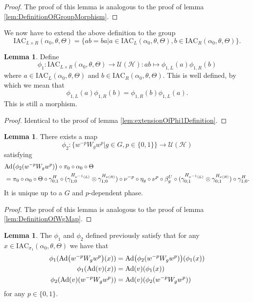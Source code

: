 \documentclass[12pt,a4paper,twoside]{article}
\newcommand{\IAC}{\textrm{IAC}}
\let\originalleft\left
\let\originalright\right
\renewcommand{\left}{\mathopen{}\mathclose\bgroup\originalleft}
\renewcommand{\right}{\aftergroup\egroup\originalright}
\newcommand{\UU}{\mathcal U}
\newcommand{\HH}{\mathcal H}
\newcommand{\Ad}[1]{\textrm{Ad}\left(#1\right)}
\theoremstyle{definition}
\newtheorem{lemma}[theorem]{Lemma}
\numberwithin{equation}{section}
\begin{document}
\begin{proof}
	The proof of this lemma is analogous to the proof of lemma \ref{lem:DefinitionOfGroupMorphism}.
\end{proof}
We now have to extend the above definition to the group
\begin{equation}
	\IAC_{L\times R}(\alpha_0,\theta,\Theta)=\{ab=ba|a\in\IAC_{L}(\alpha_0,\theta,\Theta),b\in\IAC_{R}(\alpha_0,\theta,\Theta)\}.
\end{equation}
\begin{lemma}
	Define
	\begin{equation}
		\phi_1:\IAC_{L\times R}(\alpha_0,\theta,\Theta)\rightarrow\UU(\HH):ab\mapsto \phi_{1,L}(a)\phi_{1,R}(b)
	\end{equation}
	where $a\in \IAC_{L}(\alpha_0,\theta,\Theta)$ and $b\in \IAC_{R}(\alpha_0,\theta,\Theta)$. This is well defined, by which we mean that
	\begin{equation}
		\phi_{1,L}(a)\phi_{1,R}(b)=\phi_{1,R}(b)\phi_{1,L}(a).
	\end{equation}
	This is still a morphism.
\end{lemma}
\begin{proof}
	Identical to the proof of lemma \ref{lem:extensionOfPhi1Definition}.
\end{proof}
\begin{lemma}\label{lem:DefinitionOfWgMapTwoTranslations}
	There exists a map
	\begin{equation}
		\phi_2:\{w^{-p}W_gw^p|g\in G,p\in\{0,1\}\}\rightarrow \UU(\HH)
	\end{equation}
	satisfying
	\begin{align}\label{eq:lemDefinitionOfWgMapConditionTwoTranslations}
		&\Ad{\phi_2(w^{-p}W_gw^p)}\circ\pi_0\circ\alpha_0\circ\Theta\\
		\nonumber
		&=\pi_0\circ \alpha_0\circ\Theta\circ\gamma^{H}_{0;1}\circ(\gamma^{H_{\nu^{-1}(L)}}_{1;0}\otimes\gamma^{H_{\nu(R)}}_{1;0})\circ\nu^{-p}\circ\eta_g\circ\nu^p\circ\beta_g^U\circ(\gamma^{H_{\nu^{-1}(L)}}_{0;1}\otimes\gamma^{H_{\nu(R)}}_{0;1})\circ\gamma^{H}_{1;0}.
	\end{align}
	It is unique up to a $G$ and $p$-dependent phase.
\end{lemma}
\begin{proof}
	The proof of this lemma is analogous to the proof of lemma \ref{lem:DefinitionOfWgMap}.
\end{proof}
\begin{lemma}\label{lem:phi1phi2matchingConditionH1ValuedIndex}
The $\phi_1$ and $\phi_2$ defined previously satisfy that for any $x\in\IAC_{\sigma_1}(\alpha_0,\theta,\Theta)$ we have that
	\begin{align}
		\phi_1(\Ad{w^{-p} W_g w^{p}}(x))&=\Ad{\phi_2(w^{-p} W_g w^{p})}(\phi_1(x))\\
		\phi_1(\Ad{v}(x))&=\Ad{v}(\phi_1(x))\\
		\phi_2(\Ad{v}(w^{-p} W_gw^{p}))&=\Ad{v}(\phi_2(w^{-p} W_g w^{p}))
	\end{align}
	for any $p\in\{0,1\}$.
\end{lemma}
\end{document}

